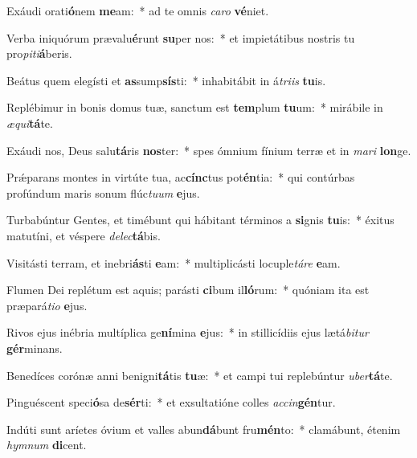\item Exáudi orati\textbf{ó}nem \textbf{me}am:~* ad te omnis \textit{ca}\textit{ro} \textbf{vé}niet.
\item Verba iniquórum prævalu\textbf{é}runt \textbf{su}per nos:~* et impietátibus nostris tu pro\textit{pi}\textit{ti}\textbf{á}beris.
\item Beátus quem elegísti et \textbf{as}sump\textbf{sís}ti:~* inhabitábit in á\textit{tri}\textit{is} \textbf{tu}is.
\item Replébimur in bonis domus tuæ, sanctum est \textbf{tem}plum \textbf{tu}um:~* mirábile in \textit{æ}\textit{qui}\textbf{tá}te.
\item Exáudi nos, Deus salu\textbf{tá}ris \textbf{nos}ter:~* spes ómnium fínium terræ et in \textit{ma}\textit{ri} \textbf{lon}ge.
\item Prǽparans montes in virtúte tua, ac\textbf{cínc}tus pot\textbf{én}tia:~* qui contúrbas profúndum maris sonum flúc\textit{tu}\textit{um} \textbf{e}jus.
\item Turbabúntur Gentes, et timébunt qui hábitant términos a \textbf{si}gnis \textbf{tu}is:~* éxitus matutíni, et véspere \textit{de}\textit{lec}\textbf{tá}bis.
\item Visitásti terram, et inebri\textbf{ás}ti \textbf{e}am:~* multiplicásti locuple\textit{tá}\textit{re} \textbf{e}am.
\item Flumen Dei replétum est aquis; parásti \textbf{ci}bum il\textbf{ló}rum:~* quóniam ita est præpará\textit{ti}\textit{o} \textbf{e}jus.
\item Rivos ejus inébria multíplica ge\textbf{ní}mina \textbf{e}jus:~* in stillicídiis ejus lætá\textit{bi}\textit{tur} \textbf{gér}minans.
\item Benedíces corónæ anni benigni\textbf{tá}tis \textbf{tu}æ:~* et campi tui replebúntur \textit{u}\textit{ber}\textbf{tá}te.
\item Pinguéscent speci\textbf{ó}sa de\textbf{sér}ti:~* et exsultatióne colles \textit{ac}\textit{cin}\textbf{gén}tur.
\item Indúti sunt aríetes óvium et valles abun\textbf{dá}bunt fru\textbf{mén}to:~* clamábunt, étenim \textit{hym}\textit{num} \textbf{di}cent.
